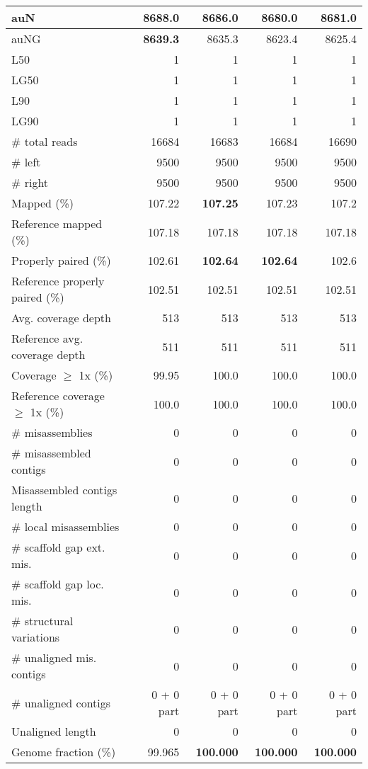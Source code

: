 \documentclass[12pt,a4paper]{article}
\begin{document}
\begin{table}[ht]
\begin{center}
\begin{tabular}{|l*{4}{|r}|}
auN & {\bf 8688.0} & 8686.0 & 8680.0 & 8681.0 \\ \hline
auNG & {\bf 8639.3} & 8635.3 & 8623.4 & 8625.4 \\ \hline
L50 & 1 & 1 & 1 & 1 \\ \hline
LG50 & 1 & 1 & 1 & 1 \\ \hline
L90 & 1 & 1 & 1 & 1 \\ \hline
LG90 & 1 & 1 & 1 & 1 \\ \hline
\# total reads & 16684 & 16683 & 16684 & 16690 \\ \hline
\# left & 9500 & 9500 & 9500 & 9500 \\ \hline
\# right & 9500 & 9500 & 9500 & 9500 \\ \hline
Mapped (\%) & 107.22 & {\bf 107.25} & 107.23 & 107.2 \\ \hline
Reference mapped (\%) & 107.18 & 107.18 & 107.18 & 107.18 \\ \hline
Properly paired (\%) & 102.61 & {\bf 102.64} & {\bf 102.64} & 102.6 \\ \hline
Reference properly paired (\%) & 102.51 & 102.51 & 102.51 & 102.51 \\ \hline
Avg. coverage depth & 513 & 513 & 513 & 513 \\ \hline
Reference avg. coverage depth & 511 & 511 & 511 & 511 \\ \hline
Coverage $\geq$ 1x (\%) & 99.95 & 100.0 & 100.0 & 100.0 \\ \hline
Reference coverage $\geq$ 1x (\%) & 100.0 & 100.0 & 100.0 & 100.0 \\ \hline
\# misassemblies & 0 & 0 & 0 & 0 \\ \hline
\# misassembled contigs & 0 & 0 & 0 & 0 \\ \hline
Misassembled contigs length & 0 & 0 & 0 & 0 \\ \hline
\# local misassemblies & 0 & 0 & 0 & 0 \\ \hline
\# scaffold gap ext. mis. & 0 & 0 & 0 & 0 \\ \hline
\# scaffold gap loc. mis. & 0 & 0 & 0 & 0 \\ \hline
\# structural variations & 0 & 0 & 0 & 0 \\ \hline
\# unaligned mis. contigs & 0 & 0 & 0 & 0 \\ \hline
\# unaligned contigs & 0 + 0 part & 0 + 0 part & 0 + 0 part & 0 + 0 part \\ \hline
Unaligned length & 0 & 0 & 0 & 0 \\ \hline
Genome fraction (\%) & 99.965 & {\bf 100.000} & {\bf 100.000} & {\bf 100.000} \\ \hline

\end{tabular}
\end{center}
\end{table}
\end{document}
